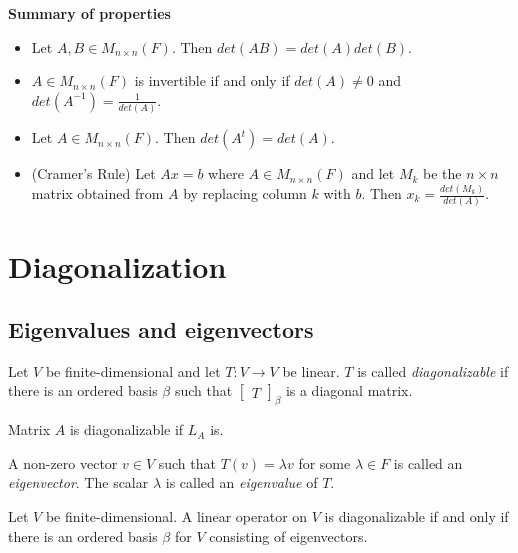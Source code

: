 \documentclass[12pt]{article}
\newenvironment{theorem}[2][Theorem]{\begin{trivlist}
\item[\hskip \labelsep {\bfseries #1}\hskip \labelsep {\bfseries #2.}]}{\end{trivlist}}
\newenvironment{definition}[2][Definition]{\begin{trivlist}
\item[\hskip \labelsep {\bfseries #1}\hskip \labelsep {\bfseries #2}]}{\end{trivlist}}
\begin{document}
\textbf{Summary of properties}

\begin{itemize}
    \item Let $A, B \in M_{n \times n}(F)$. Then $det(AB) = det(A)det(B)$. 
    
    \item $A \in M_{n \times n}(F)$ is invertible if and only if $det(A) \neq 0$ and $det(A^{-1}) = \frac{1}{det(A)}$.
    
    \item Let $A \in M_{n \times n}(F)$. Then $det(A^t) = det(A)$.
    
    \item (Cramer's Rule) Let $Ax = b$ where $A \in M_{n \times n}(F)$ and let $M_k$ be the $n \times n$ matrix obtained from $A$ by replacing column $k$ with $b$. Then $x_k = \frac{det(M_k)}{det(A)}$.
\end{itemize}

\section{Diagonalization}

\subsection{Eigenvalues and eigenvectors}

\begin{definition}{1}
Let $V$ be finite-dimensional and let $T : V \to V$ be linear. $T$ is called \textit{diagonalizable} if there is an ordered basis $\beta$ such that $\begin{bmatrix} T \end{bmatrix}_\beta$ is a diagonal matrix.
\end{definition}

\noindent Matrix $A$ is diagonalizable if $L_A$ is.

\begin{definition}{2}
A non-zero vector $v \in V$ such that $T(v) = \lambda v$ for some $\lambda \in F$ is called an \textit{eigenvector}. The scalar $\lambda$ is called an \textit{eigenvalue} of $T$.
\end{definition}

\begin{theorem}{5.1}
Let $V$ be finite-dimensional. A linear operator on $V$ is diagonalizable if and only if there is an ordered basis $\beta$ for $V$ consisting of eigenvectors.
\end{theorem}
\end{document}
